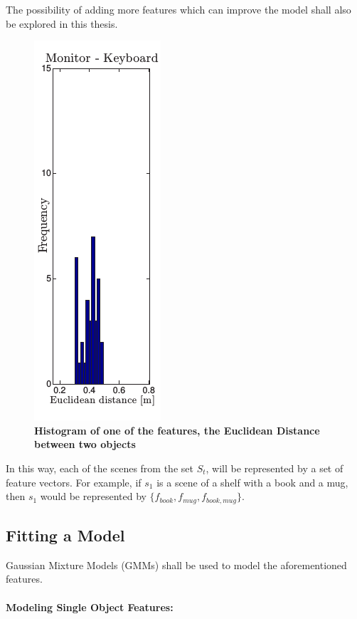 \documentclass[12pt]{article}
\begin{document}
The possibility of adding more features which can improve the model shall also be explored in this thesis.


\begin{figure} [H]
\includegraphics[scale = 0.50]{histogram.png}
\centering
\caption{\textbf{Histogram of one of the features, the Euclidean Distance between two objects \cite{KTH Dataset}}}
\end{figure}

In this way, each of the scenes from the set $S_t$, will be represented by a set of feature vectors. For example, if $s_1$ is a scene of a shelf with a book and a mug, then $s_1$ would be represented by $\{f_{book}, f_{mug}, f_{book, mug}\}$.  

\subsection{Fitting a Model}

Gaussian Mixture Models (GMMs) shall be used to model the aforementioned features.

\paragraph{Modeling Single Object Features:}
\end{document}
